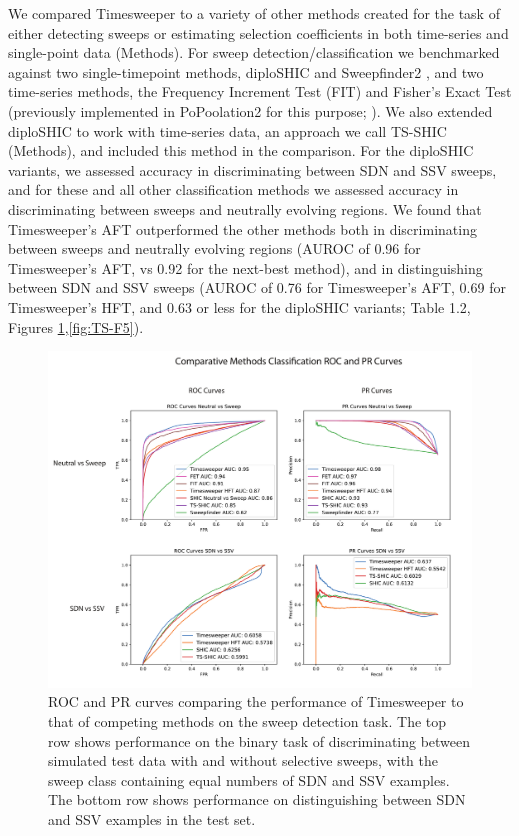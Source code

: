 We compared Timesweeper to a variety of other methods created for the task of either detecting sweeps or estimating selection coefficients in both time-series and single-point data (Methods). For sweep detection/classification we benchmarked against two single-timepoint methods, diploSHIC \cite{kernDiploSHICUpdated2018} and Sweepfinder2 \cite{degiorgioSweepFinder2IncreasedSensitivity2016}, and two time-series methods, the Frequency Increment Test (FIT) \cite{federIdentifyingSignaturesSelection2014} and Fisher’s Exact Test (previously implemented in PoPoolation2 for this purpose; \cite{koflerPoPoolation2IdentifyingDifferentiation2011}). We also extended diploSHIC to work with time-series data, an approach we call TS-SHIC (Methods), and included this method in the comparison. For the diploSHIC variants, we assessed accuracy in discriminating between SDN and SSV sweeps, and for these and all other classification methods we assessed accuracy in discriminating between sweeps and neutrally evolving regions. We found that Timesweeper’s AFT outperformed the other methods both in discriminating between sweeps and neutrally evolving regions (AUROC of 0.96 for Timesweeper’s AFT, vs 0.92 for the next-best method), and in distinguishing between SDN and SSV sweeps (AUROC of 0.76 for Timesweeper’s AFT, 0.69 for Timesweeper’s HFT, and 0.63 or less for the diploSHIC variants; Table 1.2, Figures \ref{fig:TS-F3},\ref{fig:TS-F5}).

\begin{figure}
    \centering
    \includegraphics[width=\textwidth]{figures/ch1/Figure_3.pdf}
    \caption[Comparison of Timesweeper to competing methods]{ROC and PR curves comparing the performance of Timesweeper to that of competing methods on the sweep detection task. The top row shows performance on the binary task of discriminating between simulated test data with and without selective sweeps, with the sweep class containing equal numbers of SDN and SSV examples. The bottom row shows performance on distinguishing between SDN and SSV examples in the test set.}
    \label{fig:TS-F3}
\end{figure}

